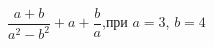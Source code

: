\begin{ex}[type=expr_calc]
	\begin{condition}
		\( \dfrac{a+b}{a^2-b^2}+a+\dfrac{b}{a} \),\quad при \( a=3 \), \( b=4 \)
	\end{condition}
\end{ex}